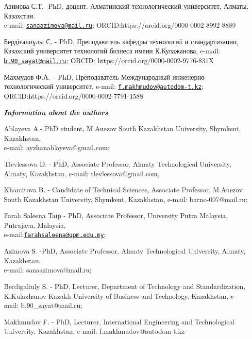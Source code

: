 Азимова С.Т.- PhD, доцент, Алматинский технологический университет,
Алматы, Казахстан.\\
e-mail:
\href{mailto:sanaazimova@mail.ru}{\nolinkurl{sanaazimova@mail.ru}};
ORCID:https://orcid.org/0000-0002-8992-8889

Бердіғалиұлы С. - PhD, Преподаватель кафедры технологий и
стандартизации, Казахский университет технологий бизнеса имени
К.Кулажанова, e-mail:
\href{mailto:b.90_sayat@mail.ru}{\nolinkurl{b.90\_sayat@mail.ru}};
ORCID: https://orcid.org/0000-0002-9776-831X

Махмудов Ф.А. -- PhD, Преподаватель Международный
инженерно-технологический университет, e-mail:
\href{mailto:f.makhmudov@autodom-t.kz}{\nolinkurl{f.makhmudov@autodom-t.kz}};
ORCID:https://orcid.org/0000-0002-7791-1588

\emph{{\bfseries Information about the authors}}

Ablayeva A.- PhD student, M.Auezov South Kazakhstan University,
Shymkent, Kazakhstan,\\
e-mail: ayzhanablayeva@gmail.com;

Tlevlessova D. - PhD, Associate Professor, Almaty Technological
University, Almaty, Kazakhstan, e-mail: tlevlessova@gmail.com,

Khamitova B. - Candidate of Technical Sciences, Associate Professor,
M.Auezov South Kazakhstan University, Shymkent, Kazakhstan, e-mail:
barno-007@mail.ru;

Farah Saleena Taip - PhD, Associate Professor, University Putra
Malaysia, Putrajaya, Malaysia,\\
e-mail:\href{mailto:farahsaleena@upm.edu.my}{\nolinkurl{farahsaleena@upm.edu.my}};

Azimova S. -PhD, Associate Professor, Almaty Technological University,
Almaty, Kazakhstan.\\
e-mail: sanaazimova@mail.ru;

Berdigaliuly S. - PhD, Lecturer, Department of Technology and
Standardization, K.Kulazhanov Kazakh University of Business and
Technology, Kazakhstan, e-mail: b.90\_sayat@mail.ru;

Makhmudov F. - PhD, Lecturer, International Engineering and
Technological University, Kazakhstan, e-mail: f.makhmudov@autodom-t.kz\